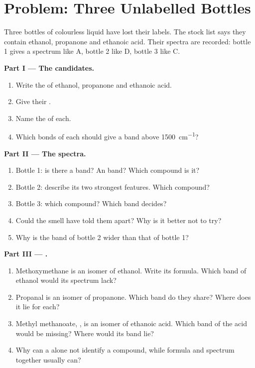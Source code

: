 \section{Problem: Three Unlabelled Bottles}

\begin{problem}
\label{pb:g11:infrared:1}
Three bottles of colourless liquid have lost their labels. The stock list
says they contain ethanol, propanone and ethanoic acid. Their spectra are
recorded: bottle 1 gives a spectrum like A, bottle 2 like D, bottle 3
like C.

\medskip
\noindent\textbf{Part I --- The candidates.}
\begin{enumerate}
  \item Write the  of ethanol, propanone and
        ethanoic acid.
  \item Give their .
  \item Name the  of each.
  \item Which bonds of each should give a band above
        \qty{1500}{cm^{-1}}?
\end{enumerate}

\medskip
\noindent\textbf{Part II --- The spectra.}
\begin{enumerate}[resume]
  \item Bottle 1: is there a  band? An  band? Which
        compound is it?
  \item Bottle 2: describe its two strongest features. Which compound?
  \item Bottle 3: which compound? Which band decides?
  \item Could the smell have told them apart? Why is it better not to
        try?
  \item Why is the  band of bottle 2 wider than that of bottle 1?
\end{enumerate}

\medskip
\noindent\textbf{Part III --- .}
\begin{enumerate}[resume]
  \item Methoxymethane is an isomer of ethanol. Write its formula. Which
        band of ethanol would its spectrum lack?
  \item Propanal is an isomer of propanone. Which band do they share?
        Where does it lie for each?
  \item Methyl methanoate, , is an isomer of ethanoic acid.
        Which band of the acid would be missing? Where would its
         band lie?
  \item Why can a  alone not identify a compound, while
        formula and spectrum together usually can?
\end{enumerate}


\end{problem}
